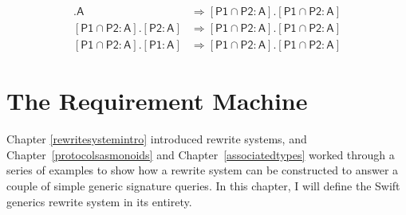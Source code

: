 \documentclass[headsepline,bibliography=totoc]{scrreport}
\newcommand{\namesym}[1]{\mathsf{#1}}
\newcommand{\genericparam}[1]{\bm{\mathsf{#1}}}
\newcommand{\proto}[1]{\bm{\mathsf{#1}}}
\newcommand{\assocsym}[2]{[\proto{#1}\colon\namesym{#2}]}
\theoremstyle{definition}
\theoremstyle{definition}
\theoremstyle{definition}
\begin{document}
\begin{listing}
\begin{align}
[\proto{P1}\cap\proto{P2}\colon\namesym{A}].\namesym{A}&\Rightarrow[\proto{P1}\cap\proto{P2}\colon\namesym{A}].[\proto{P1}\cap\proto{P2}\colon\namesym{A}]\tag{17}\\
[\proto{P1}\cap\proto{P2}\colon\namesym{A}].\assocsym{P2}{A}&\Rightarrow [\proto{P1}\cap\proto{P2}\colon\namesym{A}].[\proto{P1}\cap\proto{P2}\colon\namesym{A}]\tag{18}\\
[\proto{P1}\cap\proto{P2}\colon\namesym{A}].\assocsym{P1}{A}&\Rightarrow [\proto{P1}\cap\proto{P2}\colon\namesym{A}].[\proto{P1}\cap\proto{P2}\colon\namesym{A}]\tag{19}
\end{align}
\end{listing}

\iffalse
For example, $\proto{MutableCollection}$ is another protocol inheriting from $\proto{Collection}$ which imposes additional requirements on $\proto{Collection}$'s associated types. Listing~\ref{bidirectionalandmutable} shows a protocol with an associated type $\namesym{A}$ that conforms to \emph{both} $\proto{BidirectionalCollection}$ and $\proto{MutableCollection}$. The type parameter $\genericparam{Self}.\namesym{A}.\namesym{SubSequence}$ (and $\genericparam{Self}.\namesym{A}.\namesym{SubSequence}.\namesym{SubSequence}$, and so on) will conform to both $\proto{BidirectionalCollection}$ and $\proto{MutableCollection}$.
\begin{listing}\caption{Example of horizontal composition}\label{bidirectionalandmutable}
\begin{Verbatim}
protocol BidirectionalCollection : Collection
  where SubSequence : BidirectionalCollection,
        Indices : BidirectionalCollection {
  ...
}

protocol MutableCollection : Collection
  where SubSequence : MutableCollection {
  ...
}

protocol P {
  // A.SubSequence is both a BidirectionalCollection, and a
  // MutableCollection.
  associatedtype A : BidirectionalCollection, MutableCollection
}
\end{Verbatim}
\end{listing}
\fi

\chapter{The Requirement Machine}\label{requirementmachine}
Chapter \ref{rewritesystemintro} introduced rewrite systems, and Chapter~\ref{protocolsasmonoids} and Chapter~\ref{associatedtypes} worked through a series of examples to show how a rewrite system can be constructed to answer a couple of simple generic signature queries. In this chapter, I will define the Swift generics rewrite system in its entirety.
\end{document}
